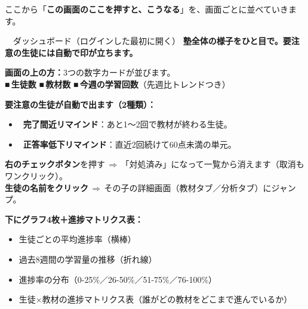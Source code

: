 \documentclass[a4paper,11pt]{jlreq}
\newcommand{\arrowto}{\,\textcolor{ipBlue}{$\Rightarrow$}\,}
\begin{document}
ここから「\textbf{この画面のここを押すと、こうなる}」を、画面ごとに並べていきます。

\vspace{0.5em}

\begin{screenbox}{\faTachometerAlt\ \  ダッシュボード（ログインした最初に開く）}
\textbf{塾全体の様子をひと目で。要注意の生徒には自動で印が立ちます。}

\begin{actionbox}
\textbf{画面の上の方：}3つの数字カードが並びます。\\[2pt]
\hspace*{1em}\textcolor{ipBlue}{■}\,\textbf{生徒数}\quad
\textcolor{ipBlue}{■}\,\textbf{教材数}\quad
\textcolor{ipBlue}{■}\,\textbf{今週の学習回数}（先週比トレンドつき）
\end{actionbox}

\begin{actionbox}
\textbf{要注意の生徒が自動で出ます（2種類）：}
\begin{itemize}[leftmargin=1.4em,itemsep=2pt]
  \item \textcolor{ipOrange}{\faExclamationCircle\ \textbf{完了間近リマインド}}：あと1〜2回で教材が終わる生徒。
  \item \textcolor{ipRed}{\faExclamationTriangle\ \textbf{正答率低下リマインド}}：直近2回続けて60点未満の単元。
\end{itemize}
\textbf{右のチェックボタン}を押す\arrowto「対処済み」になって一覧から消えます（取消もワンクリック）。\\
\textbf{生徒の名前をクリック}\arrowto その子の詳細画面（教材タブ／分析タブ）にジャンプ。
\end{actionbox}

\begin{actionbox}
\textbf{下にグラフ4枚＋進捗マトリクス表：}
\begin{itemize}[leftmargin=1.4em,itemsep=1pt]
  \item 生徒ごとの平均進捗率（横棒）
  \item 過去8週間の学習量の推移（折れ線）
  \item 進捗率の分布（0-25\%／26-50\%／51-75\%／76-100\%）
  \item 生徒×教材の進捗マトリクス表（誰がどの教材をどこまで進んでいるか）
\end{itemize}
\end{actionbox}
\end{screenbox}

\vspace{0.6em}
\end{document}
